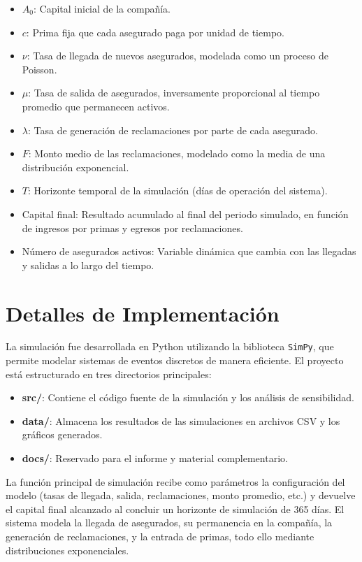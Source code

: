 \documentclass[12pt]{article}
\begin{document}
\begin{itemize}
    \item $A_0$: Capital inicial de la compañía.
    \item $c$: Prima fija que cada asegurado paga por unidad de tiempo.
    \item $\nu$: Tasa de llegada de nuevos asegurados, modelada como un proceso de Poisson.
    \item $\mu$: Tasa de salida de asegurados, inversamente proporcional al tiempo promedio que permanecen activos.
    \item $\lambda$: Tasa de generación de reclamaciones por parte de cada asegurado.
    \item $F$: Monto medio de las reclamaciones, modelado como la media de una distribución exponencial.
    \item $T$: Horizonte temporal de la simulación (días de operación del sistema).
    \item Capital final: Resultado acumulado al final del periodo simulado, en función de ingresos por primas y egresos por reclamaciones.
    \item Número de asegurados activos: Variable dinámica que cambia con las llegadas y salidas a lo largo del tiempo.
\end{itemize}


\section{Detalles de Implementación}

La simulación fue desarrollada en Python utilizando la biblioteca \texttt{SimPy}, que permite modelar sistemas de eventos discretos de manera eficiente. El proyecto está estructurado en tres directorios principales:

\begin{itemize}
    \item \textbf{src/}: Contiene el código fuente de la simulación y los análisis de sensibilidad.
    \item \textbf{data/}: Almacena los resultados de las simulaciones en archivos CSV y los gráficos generados.
    \item \textbf{docs/}: Reservado para el informe y material complementario.
\end{itemize}

La función principal de simulación recibe como parámetros la configuración del modelo (tasas de llegada, salida, reclamaciones, monto promedio, etc.) y devuelve el capital final alcanzado al concluir un horizonte de simulación de 365 días. El sistema modela la llegada de asegurados, su permanencia en la compañía, la generación de reclamaciones, y la entrada de primas, todo ello mediante distribuciones exponenciales.
\end{document}
